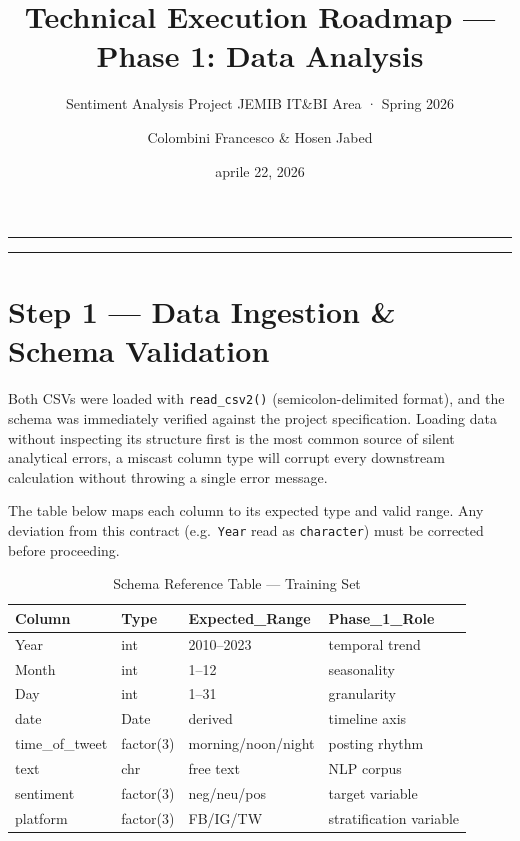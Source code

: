 \documentclass[
]{article}
\title{Technical Execution Roadmap --- Phase 1: Data Analysis}
\subtitle{Sentiment Analysis Project \textbar{} JEMIB IT\&BI Area ·
Spring 2026}
\author{Colombini Francesco \& Hosen Jabed}
\date{aprile 22, 2026}
\begin{document}
\maketitle

{
\setcounter{tocdepth}{4}
\tableofcontents
}
\begin{center}\rule{0.5\linewidth}{0.5pt}\end{center}

\begin{center}\rule{0.5\linewidth}{0.5pt}\end{center}

\section{Step 1 --- Data Ingestion \& Schema
Validation}\label{step-1-data-ingestion-schema-validation}

Both CSVs were loaded with \texttt{read\_csv2()} (semicolon-delimited
format), and the schema was immediately verified against the project
specification. Loading data without inspecting its structure first is
the most common source of silent analytical errors, a miscast column
type will corrupt every downstream calculation without throwing a single
error message.

The table below maps each column to its expected type and valid range.
Any deviation from this contract (e.g.~\texttt{Year} read as
\texttt{character}) must be corrected before proceeding.

\begin{longtable}[t]{llll}
\caption{\label{tab:schema-table}Schema Reference Table — Training Set}\\
\toprule
Column & Type & Expected\_Range & Phase\_1\_Role\\
\midrule
Year & int & 2010–2023 & temporal trend\\
Month & int & 1–12 & seasonality\\
Day & int & 1–31 & granularity\\
date & Date & derived & timeline axis\\
time\_of\_tweet & factor(3) & morning/noon/night & posting rhythm\\
\addlinespace
text & chr & free text & NLP corpus\\
sentiment & factor(3) & neg/neu/pos & target variable\\
platform & factor(3) & FB/IG/TW & stratification variable\\
\bottomrule
\end{longtable}
\end{document}
